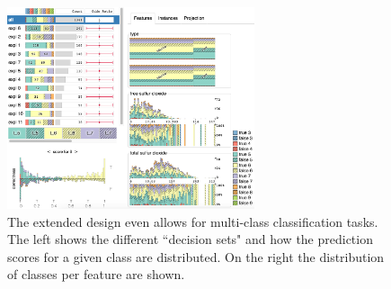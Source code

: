 \begin{figure}
\centering
\includegraphics[height=16em]{figs/new_multiclass.png}
\caption{
The extended design even allows for multi-class classification tasks.
The left shows the different ``decision sets" and how the prediction scores for a given class are distributed.
On the right the distribution of classes per feature are shown.
}
\label{figs:new_multiclass}
\end{figure}
